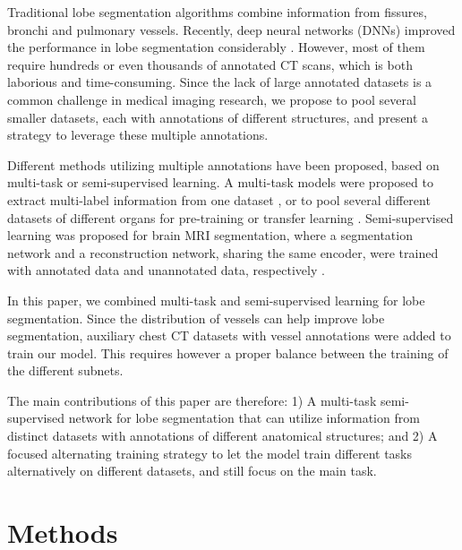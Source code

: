 Traditional lobe segmentation algorithms \cite{lassen2012automatic} combine information from fissures, bronchi and pulmonary vessels. Recently, deep neural networks (DNNs) improved the performance in lobe segmentation considerably \cite{gerard2018fissurenet, george2017pathological}. However, most of them require hundreds \cite{george2017pathological}or even thousands \cite{gerard2018fissurenet} of annotated CT scans, which is both laborious and time-consuming. Since the lack of large annotated datasets is a common challenge in medical imaging research, we propose to pool several smaller datasets, each with annotations of different structures, and present a strategy to leverage these multiple annotations.

Different methods utilizing multiple annotations have been proposed, based on multi-task or semi-supervised learning. A multi-task models were proposed to extract multi-label information from one dataset \cite{ferreira2018end}, or to pool several different datasets of different organs for pre-training or transfer learning \cite{chen2019med3d}. Semi-supervised learning was proposed for brain MRI segmentation, where a segmentation network and a reconstruction network, sharing the same encoder, were trained with annotated data and unannotated data, respectively \cite{chen2019multi}. 

In this paper, we combined multi-task and semi-supervised learning for lobe segmentation. Since the distribution of vessels can help improve lobe segmentation, auxiliary chest CT datasets with vessel annotations were added to train our model. This requires however a proper balance between the training of the different subnets.

The main contributions of this paper are therefore: 1) A multi-task semi-supervised network for lobe segmentation that can utilize information from distinct datasets with annotations of different anatomical structures; and 2) A focused alternating training strategy to let the model train different tasks alternatively on different datasets, and still focus on the main task.

\section{Methods}
